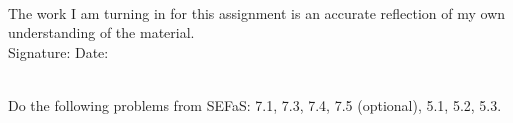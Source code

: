 \documentclass[12pt]{article}
\begin{document}
\\

\bigskip
\bigskip
\bigskip
\bigskip
\noindent The work I am turning in for this assignment is an accurate
reflection of my own understanding of the material.\\[14pt]

\noindent Signature: \underline{\hspace{7cm}} \hspace{1cm} Date:
\underline{\hspace{5cm}} 


\hspace{2mm}\\

 Do the following problems from SEFaS:
7.1, 7.3, 7.4, 7.5 (optional), 5.1, 5.2, 5.3.
\end{document}
